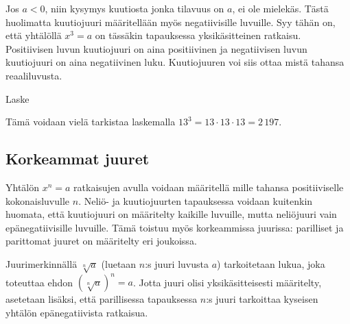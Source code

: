 
Jos $a<0$, niin kysymys kuutiosta jonka tilavuus on $a$, ei ole mielekäs. Tästä huolimatta kuutiojuuri määritellään myös negatiivisille luvuille. Syy tähän on, että yhtälöllä $x^3=a$ on tässäkin tapauksessa yksikäsitteinen ratkaisu. Positiivisen luvun kuutiojuuri on aina positiivinen ja negatiivisen luvun kuutiojuuri on aina negatiivinen luku. Kuutiojuuren voi siis ottaa mistä tahansa reaaliluvusta.


\begin{esimerkki}
Laske

\begin{esimratk}
Tämä voidaan vielä tarkistaa laskemalla $13^3 = 13\cdot 13\cdot 13=2\,197$.
\end{esimratk}

\begin{esimvast}
\end{esimvast}
\end{esimerkki}

\subsection*{Korkeammat juuret}

Yhtälön $x^n=a$ ratkaisujen avulla voidaan määritellä  mille tahansa positiiviselle kokonaisluvulle $n$. Neliö- ja kuutiojuurten tapauksessa voidaan kuitenkin huomata, että kuutiojuuri on määritelty kaikille luvuille, mutta neliöjuuri vain epänegatiivisille luvuille. Tämä toistuu myös korkeammissa juurissa: parilliset ja parittomat juuret on määritelty eri joukoissa.

Juurimerkinnällä $\sqrt[n]{a}$ (luetaan $n$:s juuri luvusta $a$) tarkoitetaan lukua, joka toteuttaa ehdon $(\sqrt[n]{a})^n = a$. Jotta juuri olisi yksikäsitteisesti määritelty, asetetaan lisäksi, että parillisessa tapauksessa $n$:s juuri tarkoittaa kyseisen yhtälön epänegatiivista ratkaisua.

